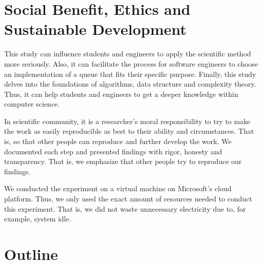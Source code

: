\documentclass[a4paper,11pt]{kth-mag}
\newcommand*{\skippara}{\par\vspace{\baselineskip} \noindent}
\begin{document}
\section{Social Benefit, Ethics and Sustainable Development}
This study can influence students and engineers to apply the scientific method more seriously.
Also, it can facilitate the process for software engineers to choose an implementation of a queue that fits their specific purpose.
Finally, this study delves into the foundations of algorithms, data structure and complexity theory.
Thus, it can help students and engineers to get a deeper knowledge within computer science.

\skippara In scientific community, it is a researcher's moral responsibility to try to make the work as easily reproducible as best to their ability and circumstances.
That is, so that other people can reproduce and further develop the work.
We documented each step and presented findings with rigor, honesty and transparency.
That is, we emphasize that other people try to reproduce our findings.

\skippara We conducted the experiment on a virtual machine on Microsoft's cloud platform.
Thus, we only used the exact amount of resources needed to conduct this experiment.
That is, we did not waste unnecessary electricity due to, for example, system idle.




\section{Outline}






%
\end{document}
